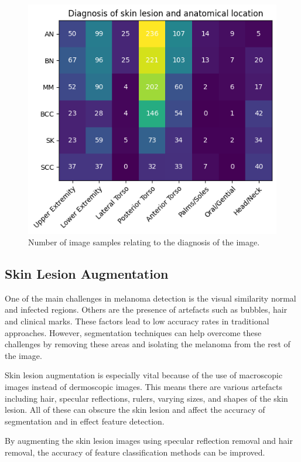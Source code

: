 \begin{figure}
	\centering
	\includegraphics[scale=0.8]{images/nhs/nhs-location-diagnosis.png}
	\caption{Number of image samples relating to the diagnosis of the image.} 
\end{figure} \label{nhs-location-diagnosis}


\subsection{Skin Lesion Augmentation}
One of the main challenges in melanoma detection is the visual similarity normal and infected regions. Others are the presence of artefacts such as bubbles, hair and clinical marks\cite{Albahli2020}. These factors lead to low accuracy rates in traditional approaches. However, segmentation techniques can help overcome these challenges by removing these areas and isolating the melanoma from the rest of the image.

Skin lesion augmentation is especially vital because of the use of macroscopic images instead of dermoscopic images. This means there are various artefacts including hair, specular reflections, rulers, varying sizes, and shapes of the skin lesion. All of these can obscure the skin lesion and affect the accuracy of segmentation\cite{Unver2019} and in effect feature detection.

By augmenting the skin lesion images using specular reflection removal and hair removal, the accuracy of feature classification methods can be improved\cite{kasmi2023}. 

